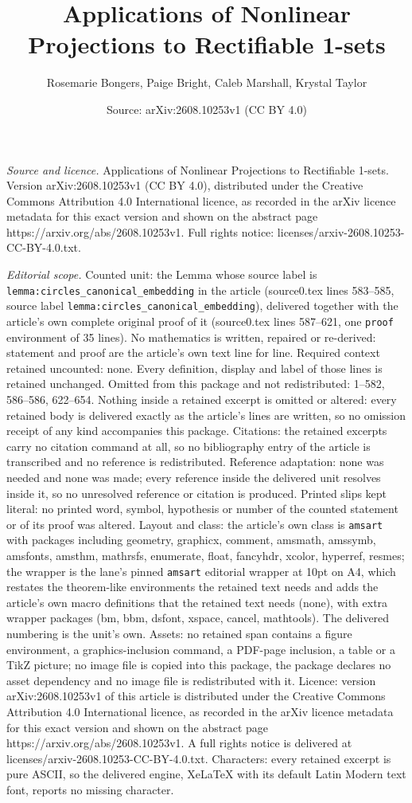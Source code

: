 \documentclass[10pt,a4paper]{amsart}
\title[Applications of Nonlinear Projections to Rectifiable 1-sets]{Applications of Nonlinear Projections to Rectifiable 1-sets}
\author{Rosemarie Bongers, Paige Bright, Caleb Marshall, Krystal Taylor}
\date{Source: arXiv:2608.10253v1 (CC BY 4.0)}
\begin{document}
\maketitle

\noindent\emph{Source and licence.} Applications of Nonlinear Projections to Rectifiable 1-sets. Version arXiv:2608.10253v1 (CC BY 4.0), distributed under the Creative Commons Attribution 4.0 International licence, as recorded in the arXiv licence metadata for this exact version and shown on the abstract page https://arxiv.org/abs/2608.10253v1. Full rights notice: licenses/arxiv-2608.10253-CC-BY-4.0.txt.\par\smallskip

\noindent\textit{Editorial scope.} Counted unit: the Lemma whose source label is \texttt{lemma:circles\_canonical\_embedding} in the article (source0.tex lines 583--585, source label \texttt{lemma:circles\_canonical\_embedding}), delivered together with the article's own complete original proof of it (source0.tex lines 587--621, one \texttt{proof} environment of 35 lines). No mathematics is written, repaired or re-derived: statement and proof are the article's own text line for line. Required context retained uncounted: none. Every definition, display and label of those lines is retained unchanged. Omitted from this package and not redistributed: 1--582, 586--586, 622--654. Nothing inside a retained excerpt is omitted or altered: every retained body is delivered exactly as the article's lines are written, so no omission receipt of any kind accompanies this package. Citations: the retained excerpts carry no citation command at all, so no bibliography entry of the article is transcribed and no reference is redistributed. Reference adaptation: none was needed and none was made; every reference inside the delivered unit resolves inside it, so no unresolved reference or citation is produced. Printed slips kept literal: no printed word, symbol, hypothesis or number of the counted statement or of its proof was altered. Layout and class: the article's own class is \texttt{amsart} with packages including geometry, graphicx, comment, amsmath, amssymb, amsfonts, amsthm, mathrsfs, enumerate, float, fancyhdr, xcolor, hyperref, resmes; the wrapper is the lane's pinned \texttt{amsart} editorial wrapper at 10pt on A4, which restates the theorem-like environments the retained text needs and adds the article's own macro definitions that the retained text needs (none), with extra wrapper packages (bm, bbm, dsfont, xspace, cancel, mathtools). The delivered numbering is the unit's own. Assets: no retained span contains a figure environment, a graphics-inclusion command, a PDF-page inclusion, a table or a TikZ picture; no image file is copied into this package, the package declares no asset dependency and no image file is redistributed with it. Licence: version arXiv:2608.10253v1 of this article is distributed under the Creative Commons Attribution 4.0 International licence, as recorded in the arXiv licence metadata for this exact version and shown on the abstract page https://arxiv.org/abs/2608.10253v1. A full rights notice is delivered at licenses/arxiv-2608.10253-CC-BY-4.0.txt. Characters: every retained excerpt is pure ASCII, so the delivered engine, XeLaTeX with its default Latin Modern text font, reports no missing character.
\end{document}
